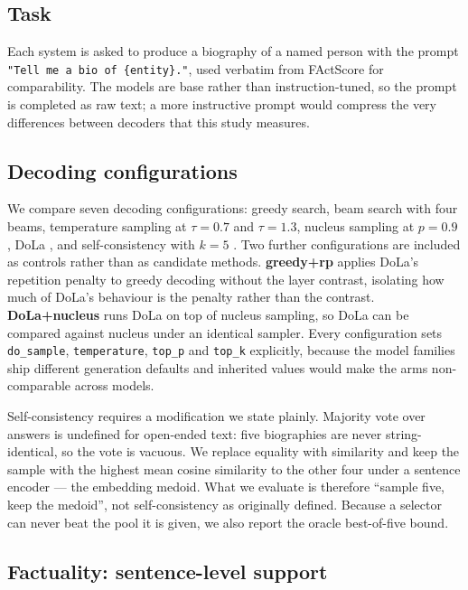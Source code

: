 \documentclass[11pt]{article}
\begin{document}
\subsection{Task}

Each system is asked to produce a biography of a named person with the prompt
\texttt{"Tell me a bio of \{entity\}."}, used verbatim from FActScore
\citep{min2023factscore} for comparability. The models are base rather than
instruction-tuned, so the prompt is completed as raw text; a more instructive
prompt would compress the very differences between decoders that this study
measures.

\subsection{Decoding configurations}

We compare seven decoding configurations: greedy search, beam search with four
beams, temperature sampling at $\tau=0.7$ and $\tau=1.3$, nucleus sampling at
$p=0.9$ \citep{holtzman2020curious}, DoLa \citep{chuang2024dola}, and
self-consistency with $k=5$ \citep{wang2023selfconsistency}. Two further
configurations are included as controls rather than as candidate methods.
\textbf{greedy+rp} applies DoLa's repetition penalty to greedy decoding
without the layer contrast, isolating how much of DoLa's behaviour is the
penalty rather than the contrast. \textbf{DoLa+nucleus} runs DoLa on top of
nucleus sampling, so DoLa can be compared against nucleus under an identical
sampler. Every configuration sets \texttt{do\_sample}, \texttt{temperature},
\texttt{top\_p} and \texttt{top\_k} explicitly, because the model families ship
different generation defaults and inherited values would make the arms
non-comparable across models.

Self-consistency requires a modification we state plainly. Majority vote over
answers is undefined for open-ended text: five biographies are never
string-identical, so the vote is vacuous. We replace equality with similarity
and keep the sample with the highest mean cosine similarity to the other four
under a sentence encoder --- the embedding medoid. What we evaluate is
therefore ``sample five, keep the medoid'', not self-consistency as originally
defined. Because a selector can never beat the pool it is given, we also report
the oracle best-of-five bound.

\subsection{Factuality: sentence-level support}
\end{document}
